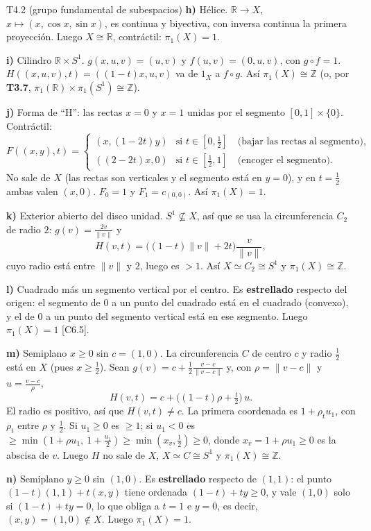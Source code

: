 \begin{ejercicio}{T4.2 (grupo fundamental de subespacios)}
\textbf{h)} Hélice. $\mathbb{R} \to X$, $x \mapsto (x,\cos x,\sin x)$, es continua y biyectiva, con inversa continua la primera proyección. Luego $X \cong \mathbb{R}$, contráctil: $\pi_1(X) = 1$.

\textbf{i)} Cilindro $\mathbb{R} \times S^1$. $g(x,u,v) = (u,v)$ y $f(u,v) = (0,u,v)$, con $g \circ f = 1$. $H((x,u,v),t) = ((1-t)x,u,v)$ va de $1_X$ a $f \circ g$. Así $\pi_1(X) \cong \mathbb{Z}$ (o, por \textbf{T3.7}, $\pi_1(\mathbb{R}) \times \pi_1(S^1) \cong \mathbb{Z}$).

\textbf{j)} Forma de ``H'': las rectas $x = 0$ y $x = 1$ unidas por el segmento $[0,1] \times \{0\}$. Contráctil:
\[ F((x,y),t) = \begin{cases} (x,(1-2t)y) & \text{si } t \in [0,\frac12] \quad \text{(bajar las rectas al segmento)}, \\ ((2-2t)x,0) & \text{si } t \in [\frac12,1] \quad \text{(encoger el segmento)}. \end{cases} \]
No sale de $X$ (las rectas son verticales y el segmento está en $y = 0$), y en $t = \frac12$ ambas valen $(x,0)$. $F_0 = 1$ y $F_1 = c_{(0,0)}$. Así $\pi_1(X) = 1$.

\textbf{k)} Exterior abierto del disco unidad. $S^1 \not\subseteq X$, así que se usa la circunferencia $C_2$ de radio $2$: $g(v) = \frac{2v}{\|v\|}$ y
\[ H(v,t) = \big((1-t)\|v\| + 2t\big)\frac{v}{\|v\|}, \]
cuyo radio está entre $\|v\|$ y $2$, luego es $> 1$. Así $X \simeq C_2 \cong S^1$ y $\pi_1(X) \cong \mathbb{Z}$.

\textbf{l)} Cuadrado más un segmento vertical por el centro. Es \textbf{estrellado} respecto del origen: el segmento de $0$ a un punto del cuadrado está en el cuadrado (convexo), y el de $0$ a un punto del segmento vertical está en ese segmento. Luego $\pi_1(X) = 1$ [C6.5].

\textbf{m)} Semiplano $x \geq 0$ sin $c = (1,0)$. La circunferencia $C$ de centro $c$ y radio $\frac12$ está en $X$ (pues $x \geq \frac12$). Sean $g(v) = c + \frac12 \frac{v-c}{\|v-c\|}$ y, con $\rho = \|v - c\|$ y $u = \frac{v-c}{\rho}$,
\[ H(v,t) = c + \big((1-t)\rho + \tfrac t2\big)\,u. \]
El radio es positivo, así que $H(v,t) \neq c$. La primera coordenada es $1 + \rho_t u_1$, con $\rho_t$ entre $\rho$ y $\frac12$. Si $u_1 \geq 0$ es $\geq 1$; si $u_1 < 0$ es $\geq \min(1 + \rho u_1,\ 1 + \frac{u_1}{2}) \geq \min(x_v, \frac12) \geq 0$, donde $x_v = 1 + \rho u_1 \geq 0$ es la abscisa de $v$. Luego $H$ no sale de $X$, $X \simeq C \cong S^1$ y $\pi_1(X) \cong \mathbb{Z}$.

\textbf{n)} Semiplano $y \geq 0$ sin $(1,0)$. Es \textbf{estrellado} respecto de $(1,1)$: el punto $(1-t)(1,1) + t(x,y)$ tiene ordenada $(1-t) + ty \geq 0$, y vale $(1,0)$ solo si $(1-t) + ty = 0$, lo que obliga a $t = 1$ e $y = 0$, es decir, $(x,y) = (1,0) \notin X$. Luego $\pi_1(X) = 1$.
\end{ejercicio}

